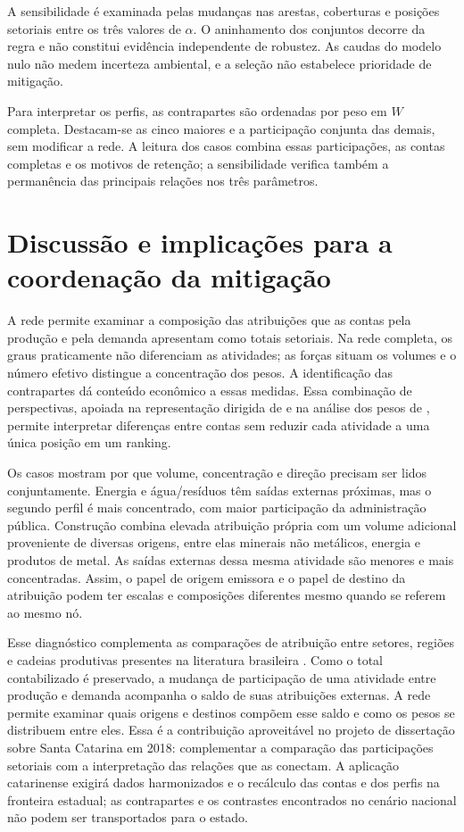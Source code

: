 \documentclass[12pt]{article}
\begin{document}
A sensibilidade é examinada pelas mudanças nas arestas, coberturas e posições setoriais entre os três valores de $\alpha$. O aninhamento dos conjuntos decorre da regra e não constitui evidência independente de robustez. As caudas do modelo nulo não medem incerteza ambiental, e a seleção não estabelece prioridade de mitigação.

Para interpretar os perfis, as contrapartes são ordenadas por peso em $W$ completa. Destacam-se as cinco maiores e a participação conjunta das demais, sem modificar a rede. A leitura dos casos combina essas participações, as contas completas e os motivos de retenção; a sensibilidade verifica também a permanência das principais relações nos três parâmetros.

\clearpage

\clearpage
\section{Discussão e implicações para a coordenação da mitigação}

A rede permite examinar a composição das atribuições que as contas pela produção e pela demanda apresentam como totais setoriais. Na rede completa, os graus praticamente não diferenciam as atividades; as forças situam os volumes e o número efetivo distingue a concentração dos pesos. A identificação das contrapartes dá conteúdo econômico a essas medidas. Essa combinação de perspectivas, apoiada na representação dirigida de \textcite{huang2019} e na análise dos pesos de \textcite{serrano2009}, permite interpretar diferenças entre contas sem reduzir cada atividade a uma única posição em um ranking.

Os casos mostram por que volume, concentração e direção precisam ser lidos conjuntamente. Energia e água/resíduos têm saídas externas próximas, mas o segundo perfil é mais concentrado, com maior participação da administração pública. Construção combina elevada atribuição própria com um volume adicional proveniente de diversas origens, entre elas minerais não metálicos, energia e produtos de metal. As saídas externas dessa mesma atividade são menores e mais concentradas. Assim, o papel de origem emissora e o papel de destino da atribuição podem ter escalas e composições diferentes mesmo quando se referem ao mesmo nó.

Esse diagnóstico complementa as comparações de atribuição entre setores, regiões e cadeias produtivas presentes na literatura brasileira \parencite{imori2015,sanguinetAzzoni2024,montoyaEtAl2026}. Como o total contabilizado é preservado, a mudança de participação de uma atividade entre produção e demanda acompanha o saldo de suas atribuições externas. A rede permite examinar quais origens e destinos compõem esse saldo e como os pesos se distribuem entre eles. Essa é a contribuição aproveitável no projeto de dissertação sobre Santa Catarina em 2018: complementar a comparação das participações setoriais com a interpretação das relações que as conectam. A aplicação catarinense exigirá dados harmonizados e o recálculo das contas e dos perfis na fronteira estadual; as contrapartes e os contrastes encontrados no cenário nacional não podem ser transportados para o estado.
\end{document}
